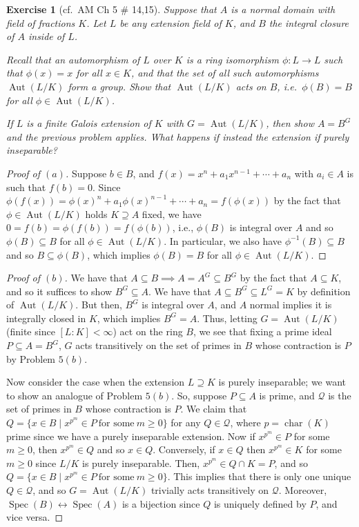 \documentclass[12pt,letterpaper]{article}
\newtheorem{problem}{Exercise}[section]
\theoremstyle{definition}
\theoremstyle{remark}
\numberwithin{figure}{problem}
\numberwithin{equation}{section}
\DeclareMathOperator{\Spec}{Spec}
\DeclareMathOperator{\Aut}{Aut}
\DeclareMathOperator{\Char}{char}
\begin{document}
\begin{problem}[cf.~AM Ch 5 \# 14,15]
  Suppose that $A$ is a normal domain with field of fractions $K$. Let $L$ be any extension field of $K$, and $B$ the integral closure of $A$ inside of $L$.
  \begin{enum}
    \item Recall that an automorphism of $L$ over $K$ is a ring isomorphism $\phi : L \to L$ such that $\phi(x) = x$ for all $x \in K$, and that the set of all such automorphisms $\Aut(L/K)$ form a group. Show that $\Aut(L/K)$ acts on $B$, i.e.~$\phi(B) = B$ for all $\phi \in \Aut(L/K)$.
    \item If $L$ is a finite Galois extension of $K$ with $G = \Aut(L/K)$, then show $A = B^G$ and the previous problem applies. What happens if instead the extension if purely inseparable?
  \end{enum}
\end{problem}
\begin{proof}[Proof of $(a)$]
  Suppose $b \in B$, and $f(x) = x^n + a_1x^{n-1} + \cdots + a_n$ with $a_i \in A$ is such that $f(b) = 0$. Since $\phi(f(x)) = \phi(x)^n + a_1\phi(x)^{n-1} + \cdots + a_n = f(\phi(x))$ by the fact that $\phi \in \Aut(L/K)$ holds $K \supseteq A$ fixed, we have $0 = f(b) = \phi(f(b)) = f(\phi(b))$, i.e., $\phi(B)$ is integral over $A$ and so $\phi(B) \subseteq B$ for all $\phi \in \Aut(L/K)$. In particular, we also have $\phi^{-1}(B) \subseteq B$ and so $B \subseteq \phi(B)$, which implies $\phi(B) = B$ for all $\phi \in \Aut(L/K)$.
\end{proof}
\begin{proof}[Proof of $(b)$]
  We have that $A \subseteq B \implies A = A^G \subseteq B^G$ by the fact that $A \subseteq K$, and so it suffices to show $B^G \subseteq A$. We have that $A \subseteq B^G \subseteq L^G = K$ by definition of $\Aut(L/K)$. But then, $B^G$ is integral over $A$, and $A$ normal implies it is integrally closed in $K$, which implies $B^G = A$. Thus, letting $G = \Aut(L/K)$ (finite since $[L:K] < \infty$) act on the ring $B$, we see that fixing a prime ideal $P \subseteq A = B^G$, $G$ acts transitively on the set of primes in $B$ whose contraction is $P$ by Problem $5(b)$.
  \par Now consider the case when the extension $L \supseteq K$ is purely inseparable; we want to show an analogue of Problem $5(b)$. So, suppose $P \subseteq A$ is prime, and $\mathcal{Q}$ is the set of primes in $B$ whose contraction is $P$. We claim that $Q = \{x \in B \mid x^{p^m} \in P~\text{for some}~m \ge 0\}$ for any $Q \in \mathcal{Q}$, where $p = \Char(K)$ prime since we have a purely inseparable extension. Now if $x^{p^m} \in P$ for some $m \ge 0$, then $x^{p^m} \in Q$ and so $x \in Q$. Conversely, if $x \in Q$ then $x^{p^m} \in K$ for some $m \ge 0$ since $L/K$ is purely inseparable. Then, $x^{p^m} \in Q \cap K = P$, and so $Q = \{x \in B \mid x^{p^m} \in P~\text{for some}~m \ge 0\}$. This implies that there is only one unique $Q \in \mathcal{Q}$, and so $G = \Aut(L/K)$ trivially acts transitively on $\mathcal{Q}$. Moreover, $\Spec(B) \leftrightarrow \Spec(A)$ is a bijection since $Q$ is uniquely defined by $P$, and vice versa.
\end{proof}
\end{document}
